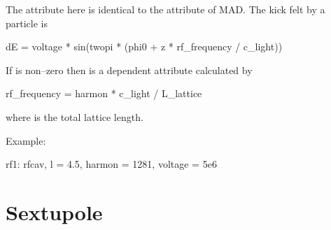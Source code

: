 {{The  attribute here is identical to the  attribute of
MAD. The kick felt by a particle is 
\begin{example}
  dE = voltage * sin(twopi * (phi0 + z * rf_frequency / c_light))
\end{example}
If  is non--zero then  is a dependent
attribute calculated by
\begin{example}
  rf_frequency = harmon * c_light / L_lattice 
\end{example}
where  is the total lattice length.

Example:
\begin{example}
  rf1: rfcav, l = 4.5, harmon = 1281, voltage = 5e6
\end{example}

\section{Sextupole}
\label{s:sex}

}}
